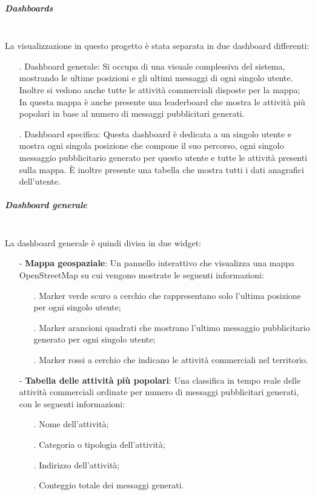 \documentclass[10pt]{article}
\newcommand{\mysubparagraph}[1]{\subparagraph{#1}\mbox{}\\}
\begin{document}
        \mysubparagraph{Dashboards}
        La visualizzazione in questo progetto è stata separata in due dashboard differenti:
        \begin{itemize}
            \item[.] Dashboard generale: Si occupa di una visuale complessiva del sistema, mostrando le ultime posizioni e gli ultimi messaggi di ogni singolo utente. Inoltre si vedono anche tutte le attività commerciali disposte per la mappa;
            In questa mappa è anche presente una leaderboard che mostra le attività più popolari in base al numero di messaggi pubblicitari generati.
            \item[.] Dashboard specifica: Questa dashboard è dedicata a un singolo utente e mostra ogni singola posizione che compone il suo percorso, ogni singolo messaggio pubblicitario generato per questo utente e tutte le attività presenti sulla mappa.
            È inoltre presente una tabella che mostra tutti i dati anagrafici dell'utente.
        \end{itemize}

        \mysubparagraph{Dashboard generale}
        La dashboard generale è quindi divisa in due widget:
        \begin{itemize}
            \item[-] \textbf{Mappa geospaziale}: Un pannello interattivo che visualizza una mappa OpenStreetMap su cui vengono mostrate le seguenti informazioni:
            \begin{itemize}
                \item[.] Marker verde scuro a cerchio che rappresentano solo l'ultima posizione per ogni singolo utente;
                \item[.] Marker arancioni quadrati che mostrano l'ultimo messaggio pubblicitario generato per ogni singolo utente;
                \item[.] Marker rossi a cerchio che indicano le attività commerciali nel territorio.
            \end{itemize}

            \item[-] \textbf{Tabella delle attività più popolari}: Una classifica in tempo reale delle attività commerciali ordinate per numero di messaggi pubblicitari generati, con le seguenti informazioni:
            \begin{itemize}
                \item[.] Nome dell'attività;
                \item[.] Categoria o tipologia dell'attività;
                \item[.] Indirizzo dell'attività;
                \item[.] Conteggio totale dei messaggi generati.
            \end{itemize}
        \end{itemize}
\end{document}
